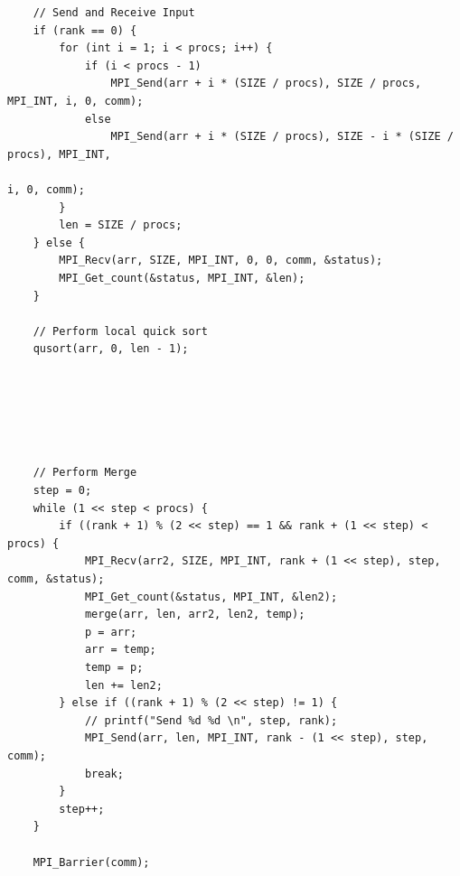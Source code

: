 \documentclass[11pt,a4paper,oneside]{article}
\begin{document}
    \begin{Verbatim}
    // Send and Receive Input
    if (rank == 0) {
    	for (int i = 1; i < procs; i++) {
    		if (i < procs - 1)
    			MPI_Send(arr + i * (SIZE / procs), SIZE / procs, MPI_INT, i, 0, comm);
    		else
    			MPI_Send(arr + i * (SIZE / procs), SIZE - i * (SIZE / procs), MPI_INT,
    																	  i, 0, comm);
    	}
    	len = SIZE / procs;
    } else {
    	MPI_Recv(arr, SIZE, MPI_INT, 0, 0, comm, &status);
    	MPI_Get_count(&status, MPI_INT, &len);
    }
    
    // Perform local quick sort
    qusort(arr, 0, len - 1);
    
    
    
    
    
    
    // Perform Merge
    step = 0;
    while (1 << step < procs) {
    	if ((rank + 1) % (2 << step) == 1 && rank + (1 << step) < procs) {
    		MPI_Recv(arr2, SIZE, MPI_INT, rank + (1 << step), step, comm, &status);
    		MPI_Get_count(&status, MPI_INT, &len2);
			merge(arr, len, arr2, len2, temp);
    		p = arr;
    		arr = temp;
    		temp = p;
    		len += len2;
    	} else if ((rank + 1) % (2 << step) != 1) {
    		// printf("Send %d %d \n", step, rank);
    		MPI_Send(arr, len, MPI_INT, rank - (1 << step), step, comm);
    		break;
    	}
    	step++;
    }
    
    MPI_Barrier(comm);
    
    \end{Verbatim}
    
\end{document}
